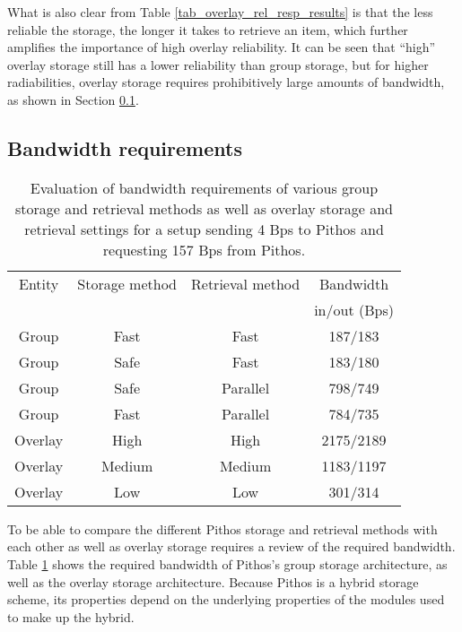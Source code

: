 What is also clear from Table \ref{tab_overlay_rel_resp_results} is that the less reliable the storage, the longer it takes to retrieve an item, which further amplifies the importance of high overlay reliability. It can be seen that ``high'' overlay storage still has a lower reliability than group storage, but for higher radiabilities, overlay storage requires prohibitively large amounts of bandwidth, as shown in Section \ref{bandwidth_requirements}.

\subsection{Bandwidth requirements}
\label{bandwidth_requirements}

\begin{table}[htbp]
\centering
\begin{tabular}{|c|c|c|c|}
\hline
Entity & Storage method & Retrieval method     & Bandwidth\\
       &                &                      & in/out (Bps)\\
\hline
Group   &   Fast        &   Fast               &   187/183\\
Group   &   Safe        &   Fast               &   183/180\\
Group   &   Safe        &   Parallel           &   798/749\\
Group   &   Fast        &   Parallel           &   784/735\\
\hline
Overlay &   High        &   High               &  2175/2189\\
Overlay &   Medium      &   Medium             &  1183/1197\\
Overlay &   Low         &   Low                &  301/314  \\
\hline
\end{tabular}
\caption{Evaluation of bandwidth requirements of various group storage and retrieval methods as well as overlay storage and retrieval settings for a setup sending 4 Bps to Pithos and requesting 157 Bps from Pithos.}
\label{tab_bandwidth_results}
\end{table}

To be able to compare the different Pithos storage and retrieval methods with each other as well as overlay storage requires a review of the required bandwidth. Table \ref{tab_bandwidth_results} shows the required bandwidth of Pithos's group storage architecture, as well as the overlay storage architecture. Because Pithos is a hybrid storage scheme, its properties depend on the underlying properties of the modules used to make up the hybrid.

